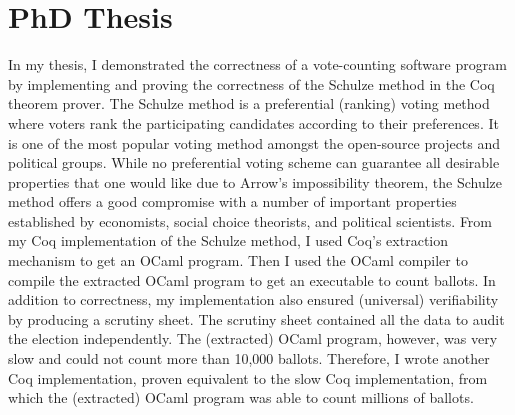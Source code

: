 \documentclass[11pt,a4paper,roman]{moderncv}
\begin{document}
\section{PhD Thesis}
In my thesis, I demonstrated the correctness of a vote-counting software program 
by implementing and proving the correctness of the Schulze method in the Coq theorem 
prover. 
The Schulze method is a preferential (ranking) voting method where voters rank the participating 
candidates according to their preferences. It is one of the most popular voting method amongst the open-source projects and 
political groups.
While no preferential voting scheme can guarantee all
desirable properties that one would like due to Arrow's impossibility theorem, 
the Schulze method offers a good compromise with a number of important properties established by economists, 
social choice theorists, and political scientists. From my Coq implementation of the Schulze method,
I used Coq's extraction mechanism to get an OCaml program.
Then I used the OCaml compiler to compile the extracted OCaml program to get an executable  
to count ballots.
In addition to correctness, my implementation also
ensured (universal) verifiability by producing a scrutiny sheet. The scrutiny sheet contained all 
the data to audit the election independently. The (extracted) OCaml program, however, was 
very slow and could not count more than 10,000 ballots. Therefore, I wrote another 
Coq implementation, proven equivalent to the slow Coq 
implementation, from which the (extracted) 
OCaml program was able to count millions of ballots.
\end{document}
